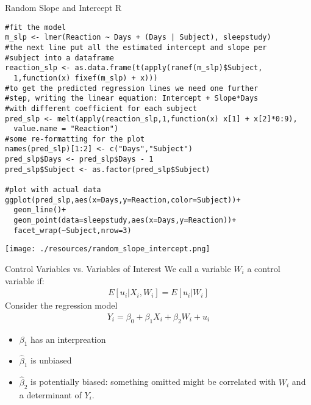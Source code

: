 \documentclass[aspectratio=169]{beamer}
\begin{document}
\begin{frame}[fragile]{Random Slope and Intercept R}
\tiny
\begin{verbatim}
#fit the model
m_slp <- lmer(Reaction ~ Days + (Days | Subject), sleepstudy)
#the next line put all the estimated intercept and slope per
#subject into a dataframe
reaction_slp <- as.data.frame(t(apply(ranef(m_slp)$Subject,
  1,function(x) fixef(m_slp) + x)))
#to get the predicted regression lines we need one further
#step, writing the linear equation: Intercept + Slope*Days
#with different coefficient for each subject
pred_slp <- melt(apply(reaction_slp,1,function(x) x[1] + x[2]*0:9),
  value.name = "Reaction")
#some re-formatting for the plot
names(pred_slp)[1:2] <- c("Days","Subject")
pred_slp$Days <- pred_slp$Days - 1
pred_slp$Subject <- as.factor(pred_slp$Subject)

#plot with actual data
ggplot(pred_slp,aes(x=Days,y=Reaction,color=Subject))+
  geom_line()+
  geom_point(data=sleepstudy,aes(x=Days,y=Reaction))+
  facet_wrap(~Subject,nrow=3)
\end{verbatim}
\end{frame}

\begin{frame}%
\begin{center}
\texttt{[image: ./resources/random\_slope\_intercept.png]}
\end{center}
\end{frame}

\begin{frame}{Control Variables vs. Variables of Interest}
We call a variable $W_i$ a control variable if:
\begin{align*}
E[u_i | X_i, W_i] = E[u_i | W_i]
\end{align*}
Consider the regression model
\begin{align*}
Y_i = \beta_0 + \beta_1 X_i + \beta_2 W_i + u_i
\end{align*}
\begin{itemize}
    \item $\beta_1$ has an interpreation
    \item $\widehat{\beta}_1$ is unbiased
    \item $\widehat{\beta}_2$ is potentially biased: something omitted might be correlated with $W_i$ and a determinant of $Y_i$. 
\end{itemize}
\end{frame}
\end{document}

